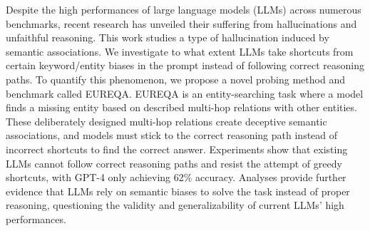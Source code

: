 Despite the high performances of large language models (LLMs) across numerous benchmarks, recent research has unveiled their suffering from hallucinations and unfaithful reasoning. This work studies a type of hallucination induced by semantic associations. We investigate to what extent LLMs take shortcuts from certain keyword/entity biases in the prompt instead of following correct reasoning paths. To quantify this phenomenon, we propose a novel probing method and benchmark called EUREQA. EUREQA is an entity-searching task where a model finds a missing entity based on described multi-hop relations with other entities. These deliberately designed multi-hop relations create deceptive semantic associations, and models must stick to the correct reasoning path instead of incorrect shortcuts to find the correct answer. Experiments show that existing LLMs cannot follow correct reasoning paths and resist the attempt of greedy shortcuts, with GPT-4 only achieving 62\% accuracy. Analyses provide further evidence that LLMs rely on semantic biases to solve the task  instead of proper reasoning, questioning the validity and generalizability of current LLMs' high performances.